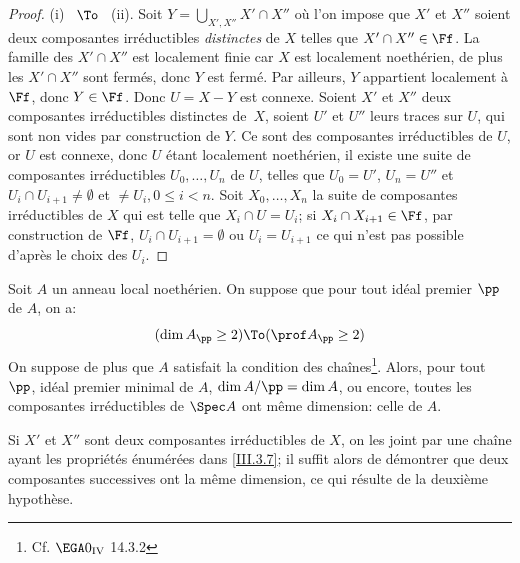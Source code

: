 \begin{proof}
(i) ~$\To$~ (ii). Soit $Y=\bigcup_{X', X''} X'\cap X''$ o\`u l'on impose que $X'$ et $X''$ soient deux composantes irr\'eductibles \emph{distinctes} de $X$ telles que $X'\cap X'' \in \Ff$. La famille des $X'\cap X''$ est localement finie car $X$ est localement noeth\'erien, de plus les $X'\cap X''$ sont ferm\'es, donc $Y$ est ferm\'e. Par ailleurs, $Y$ appartient localement \`a $\Ff$, donc $Y\in \Ff$. Donc $U=X-Y$ est connexe. Soient $X'$ et $X''$ deux composantes irr\'eductibles distinctes de~$X$, soient $U'$ et $U''$ leurs traces sur $U$, qui sont non vides par construction de $Y$. Ce sont des composantes irr\'eductibles de $U$, or $U$ est connexe, donc $U$ \'etant localement noeth\'erien, il existe une suite de composantes irr\'eductibles $U_0, \ldots, U_n$ de $U$, telles que $U_0=U'$, $U_n=U''$ et $U_{i}\cap U_{i+1}\neq \emptyset$ et $\neq U_{i}, 0\leq i < n$. Soit $X_0, \ldots, X_n$ la suite de composantes irr\'eductibles de $X$ qui est telle que $X_{i}\cap U=U_{i}$; si $X_{i}\cap X_{i+1}\in \Ff$, par construction de $\Ff$, $U_{i}\cap U_{i+1}=\emptyset$ ou $U_{i}=U_{i+1}$ ce qui n'est pas possible d'apr\`es le choix des $U_{i}$.
\end{proof}

\begin{corollaire} \label{III.3.9}
Soit $A$ un anneau local noeth\'erien. On suppose que pour tout id\'eal premier $\pp$ de $A$, on a:
\[
(\dim A_\pp \geq 2) \To (\prof A_\pp \geq 2)
\]
On suppose de plus que $A$ satisfait la condition des cha\^ines\footnote{Cf. $\EGA 0_{\textup{IV}}$ 14.3.2}. Alors, pour tout $\pp$, id\'eal premier minimal de $A$, $\dim A/\pp =\dim A$, ou encore, toutes les composantes irr\'eductibles de $\Spec A$ ont m\^eme dimension: celle de $A$.
\end{corollaire}

Si $X'$ et $X''$ sont deux composantes irr\'eductibles de $X$, on les joint par une cha\^ine ayant les propri\'et\'es \'enum\'er\'ees dans \ignorespaces \ref{III.3.7}; il suffit alors de d\'emontrer que deux composantes successives ont la m\^eme dimension, ce qui r\'esulte de la deuxi\`eme hypoth\`ese.


